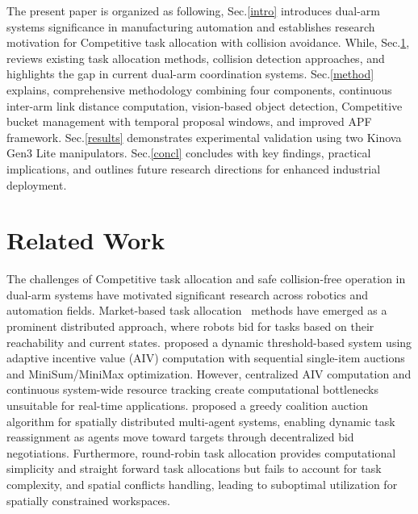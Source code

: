 \documentclass[pdflatex,sn-mathphys-num]{sn-jnl}%
\theoremstyle{thmstyleone}%
\theoremstyle{thmstylethree}%
\begin{document}
The present paper is organized as following, Sec.\ref{intro} introduces dual-arm systems significance in manufacturing automation and establishes research motivation for Competitive task allocation with collision avoidance. While, Sec.\ref{background}, reviews existing task allocation methods, collision detection approaches, and highlights the gap in current dual-arm coordination systems. Sec.\ref{method} explains, comprehensive methodology combining four components, continuous inter-arm link distance computation, vision-based object detection, Competitive bucket management with temporal proposal windows, and improved APF framework. Sec.\ref{results} demonstrates experimental validation using two Kinova Gen3 Lite manipulators. Sec.\ref{concl} concludes with key findings, practical implications, and outlines future research directions for enhanced industrial deployment.

\section{Related Work}
\label{background}
The challenges of Competitive task allocation and safe collision-free operation in dual-arm systems have motivated significant research across robotics and automation fields. Market-based task allocation~\cite{aziz2022,galati, quinton} methods have emerged as a prominent distributed approach, where robots bid for tasks based on their reachability and current states. \cite{intro_8} proposed a dynamic threshold-based system using adaptive incentive value (AIV) computation with sequential single-item auctions and MiniSum/MiniMax optimization. However, centralized AIV computation and continuous system-wide resource tracking create computational bottlenecks unsuitable for real-time applications. \cite{greedymarket, rinaldi2023multi} proposed a greedy coalition auction algorithm for spatially distributed multi-agent 
systems, enabling dynamic task reassignment as agents move toward targets through decentralized bid negotiations. Furthermore, round-robin task allocation provides computational simplicity and straight forward task allocations but fails to account for task complexity, and spatial conflicts handling, leading to suboptimal utilization for spatially constrained workspaces\cite{korsah2013comprehensive}\cite{schneider2015auction}.
\end{document}
